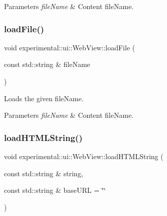 \begin{DoxyParams}{Parameters}
{\em file\+Name} & Content file\+Name. \\
\hline
\end{DoxyParams}
\mbox{\label{classexperimental_1_1ui_1_1WebView_ac8b1fdef3df527682cfb9b875856f990}} 
\subsubsection{\texorpdfstring{load\+File()}{loadFile()}\hspace{0.1cm}{\footnotesize\ttfamily [2/2]}}
{\footnotesize\ttfamily void experimental\+::ui\+::\+Web\+View\+::load\+File (\begin{DoxyParamCaption}\item[{const std\+::string \&}]{file\+Name }\end{DoxyParamCaption})}

Loads the given file\+Name.


\begin{DoxyParams}{Parameters}
{\em file\+Name} & Content file\+Name. \\
\hline
\end{DoxyParams}
\mbox{\label{classexperimental_1_1ui_1_1WebView_aead3a24dfa6db7bb8175d3616a415c20}} 
\subsubsection{\texorpdfstring{load\+H\+T\+M\+L\+String()}{loadHTMLString()}\hspace{0.1cm}{\footnotesize\ttfamily [1/2]}}
{\footnotesize\ttfamily void experimental\+::ui\+::\+Web\+View\+::load\+H\+T\+M\+L\+String (\begin{DoxyParamCaption}\item[{const std\+::string \&}]{string,  }\item[{const std\+::string \&}]{base\+U\+RL = {\ttfamily \char`\"{}\char`\"{}} }\end{DoxyParamCaption})}

